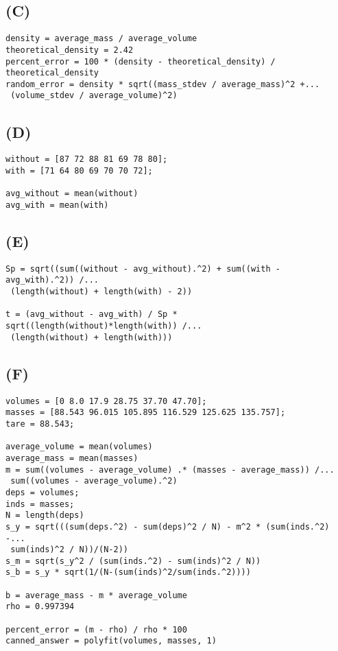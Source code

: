 \documentclass{article}
\begin{document}
    \subsection{(C)}
        \begin{lstlisting}
density = average_mass / average_volume
theoretical_density = 2.42
percent_error = 100 * (density - theoretical_density) / theoretical_density
random_error = density * sqrt((mass_stdev / average_mass)^2 +...
 (volume_stdev / average_volume)^2)
        \end{lstlisting}

    \subsection{(D)}
        \begin{lstlisting}
without = [87 72 88 81 69 78 80];
with = [71 64 80 69 70 70 72];

avg_without = mean(without)
avg_with = mean(with)
        \end{lstlisting}

    \subsection{(E)}
        \begin{lstlisting}
Sp = sqrt((sum((without - avg_without).^2) + sum((with - avg_with).^2)) /...
 (length(without) + length(with) - 2))

t = (avg_without - avg_with) / Sp * sqrt((length(without)*length(with)) /...
 (length(without) + length(with)))
        \end{lstlisting}

    \subsection{(F)}
        \begin{lstlisting}
volumes = [0 8.0 17.9 28.75 37.70 47.70];
masses = [88.543 96.015 105.895 116.529 125.625 135.757];
tare = 88.543;

average_volume = mean(volumes)
average_mass = mean(masses)
m = sum((volumes - average_volume) .* (masses - average_mass)) /...
 sum((volumes - average_volume).^2)
deps = volumes;
inds = masses;
N = length(deps)
s_y = sqrt(((sum(deps.^2) - sum(deps)^2 / N) - m^2 * (sum(inds.^2) -...
 sum(inds)^2 / N))/(N-2))
s_m = sqrt(s_y^2 / (sum(inds.^2) - sum(inds)^2 / N))
s_b = s_y * sqrt(1/(N-(sum(inds)^2/sum(inds.^2))))

b = average_mass - m * average_volume
rho = 0.997394

percent_error = (m - rho) / rho * 100
canned_answer = polyfit(volumes, masses, 1)
        \end{lstlisting}
\end{document}
